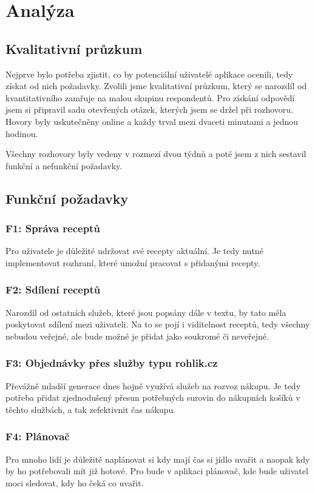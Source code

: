 
\chapter{Analýza}

\section{Kvalitativní průzkum}

Nejprve bylo potřeba zjistit, co by potenciální uživatelé aplikace ocenili, tedy získat od nich požadavky.
Zvolili jsme kvalitativní průzkum, který se narozdíl od kvantitativního zamřuje na malou skupinu respondentů.
Pro získání odpovědí jsem si připravil sadu otevřených otázek, kterých jsem se držel při rozhovoru. Hovory byly
uskutečněny online a každy trval mezi dvaceti minutami a jednou hodinou.

Všechny rozhovory byly vedeny v rozmezí dvou týdnů a poté jsem z nich sestavil funkční a nefunkční požadavky.

\section{Funkční požadavky}

\subsection{F1: Správa receptů}
Pro uživatele je důležité udržovat své recepty aktuální. Je tedy nutné implementovat rozhraní, které umožní pracovat s
přidanými recepty.
\subsection{F2: Sdílení receptů}
Narozdíl od ostatních služeb, které jsou popsány dále v textu, by tato měla poskytovat sdílení mezi uživateli. Na to se pojí i
viditelnost receptů, tedy všechny nebudou veřejné, ale bude možné je přidat jako soukromé či neveřejné.
\subsection{F3: Objednávky přes služby typu rohlik.cz}
Převážně mladší generace dnes hojně využívá služeb na rozvoz nákupu. Je tedy potřeba přidat zjednodušený přesun potřebných
surovin do nákupních košíků v těchto službách, a tak zefektivnit čas nákupu.
\subsection{F4: Plánovač}
Pro mnoho lidí je důležité naplánovat si kdy mají čas si jídlo uvařit a naopak kdy by ho potřebovali mít již hotové. Pro bude v
aplikaci plánovač, kde bude uživatel moci sledovat, kdy ho čeká co uvařit.
